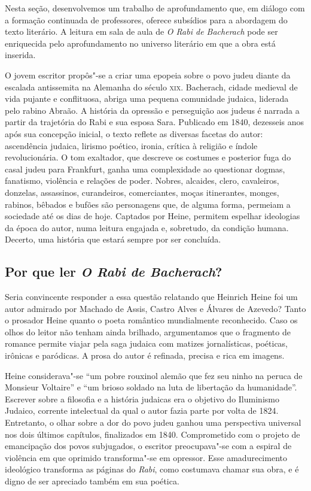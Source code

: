 \documentclass[12pt]{extarticle}
\begin{document}
Nesta seção, desenvolvemos um trabalho de aprofundamento que, em diálogo
com a formação continuada de professores, oferece subsídios para a
abordagem do texto literário. A leitura em sala de aula de \emph{O Rabi
de Bacherach} pode ser enriquecida pelo aprofundamento no universo
literário em que a obra está inserida.

O jovem escritor propôs"-se a criar uma epopeia sobre o
povo judeu diante da escalada antissemita na Alemanha do século \textsc{xix}.
Bacherach, cidade medieval de vida pujante e conflituosa, abriga uma
pequena comunidade judaica, liderada pelo rabino Abraão. A história da
opressão e perseguição aos judeus é narrada a partir da trajetória do
Rabi e sua esposa Sara. Publicado em 1840, dezesseis anos após sua
concepção inicial, o texto reflete as diversas facetas do autor:
ascendência judaica, lirismo poético, ironia, crítica à religião e
índole revolucionária. O tom exaltador, que descreve os costumes e
posterior fuga do casal judeu para Frankfurt, ganha uma complexidade ao
questionar dogmas, fanatismo, violência e relações de poder.
Nobres, alcaides, clero, cavaleiros, donzelas, assassinos, curandeiros,
comerciantes, moças itinerantes, monges, rabinos, bêbados e bufões são
personagens que, de alguma forma, permeiam a sociedade até os dias de
hoje. Captados por Heine, permitem espelhar ideologias da época do
autor, numa leitura engajada e, sobretudo, da condição humana. Decerto,
uma história que estará sempre por ser concluída.

\subsection{Por que ler \textit{O Rabi de Bacherach}?}

Seria convincente responder a essa questão relatando que Heinrich Heine
foi um autor admirado por Machado de Assis, Castro Alves e Álvares de
Azevedo? Tanto o prosador Heine quanto o poeta romântico mundialmente
reconhecido. Caso os olhos do leitor não tenham ainda brilhado,
argumentamos que o fragmento de romance permite viajar pela saga judaica
com matizes jornalísticas, poéticas, irônicas e paródicas. A prosa do
autor é refinada, precisa e rica em imagens.




Heine considerava"-se ``um pobre rouxinol alemão que fez seu ninho na
peruca de Monsieur Voltaire'' e ``um brioso soldado na luta de
libertação da humanidade''. Escrever sobre a filosofia e a história
judaicas era o objetivo do Iluminismo Judaico, corrente intelectual da
qual o autor fazia parte por volta de 1824. Entretanto, o olhar sobre a
dor do povo judeu ganhou uma perspectiva universal nos dois últimos
capítulos, finalizados em 1840. Comprometido com o projeto de
emancipação dos povos subjugados, o escritor preocupava"-se com a espiral
de violência em que oprimido transforma"-se em opressor. Esse
amadurecimento ideológico transforma as páginas do \emph{Rabi}, como costumava
chamar sua obra, e é digno de ser apreciado também em sua poética.
\end{document}
